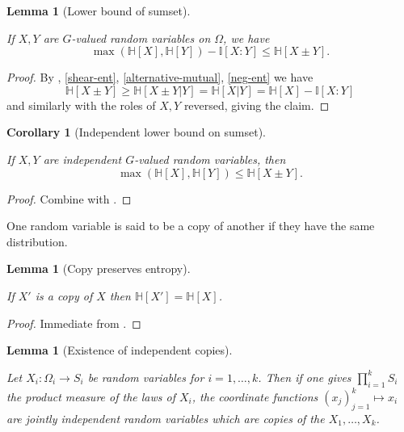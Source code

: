 \documentclass[10pt,a4paper]{article}
\newtheorem{lemma}[theorem]{Lemma}
\newtheorem{corollary}[theorem]{Corollary}
\newcommand{\lean}[1]{}
\newcommand{\uses}[1]{}
\newcommand{\leanok}{}
\newcommand{\bbH}{\mathbb{H}}
\newcommand{\bbI}{\mathbb{I}}
\begin{document}
\begin{lemma}[Lower bound of sumset]\label{sumset-lower-gen}
  \lean{ProbabilityTheory.max_entropy_sub_mutualInfo_le_entropy_add, ProbabilityTheory.max_entropy_sub_mutualInfo_le_entropy_sub}\leanok
  If $X,Y$ are $G$-valued random variables on $\Omega$, we have
$$ \max(\bbH[X], \bbH[Y]) -  \bbI[X:Y] \leq \bbH[X \pm Y].$$
\end{lemma}

\begin{proof}\uses{cond-reduce, alternative-mutual, shear-ent, neg-ent} \leanok
    By , \ref{shear-ent}, \ref{alternative-mutual}, \ref{neg-ent} we have
$$
 \bbH[X\pm Y] \geq \bbH[X\pm Y|Y] = \bbH[X|Y]= \bbH[X] -  \bbI[X:Y]
$$
and similarly with the roles of $X,Y$ reversed, giving the claim.
\end{proof}


\begin{corollary}[Independent lower bound on sumset]
  \label{sumset-lower}
  \lean{ProbabilityTheory.max_entropy_le_entropy_add, ProbabilityTheory.max_entropy_le_entropy_sub}
  \leanok

  If $X,Y$ are independent $G$-valued random variables, then
  $$\max(\bbH[X], \bbH[Y]) \leq \bbH[X\pm Y]. $$
\end{corollary}
\begin{proof}
  \uses{sumset-lower-gen, vanish-entropy}
  \leanok

  Combine  with .
\end{proof}

One random variable is said to be a copy of another if they have the same distribution.

\begin{lemma}[Copy preserves entropy]\label{copy-ent}
  \uses{entropy-def}
  \lean{ProbabilityTheory.IdentDistrib.entropy_congr}\leanok
  If $X'$ is a copy of $X$ then $\bbH[X'] = \bbH[X]$.
\end{lemma}

\begin{proof}\leanok Immediate from .
\end{proof}

\begin{lemma}[Existence of independent copies]\label{independent-exist}
  \uses{independent-def}
  \lean{ProbabilityTheory.independent_copies, ProbabilityTheory.independent_copies', ProbabilityTheory.independent_copies_two, ProbabilityTheory.independent_copies3_nondep} \leanok
  Let $X_i : \Omega_i \to S_i$ be random variables for $i=1,\dots,k$.  Then if one gives $\prod_{i=1}^k S_i$ the product measure of the laws of $X_i$, the coordinate functions $(x_j)_{j=1}^k \mapsto x_i$ are jointly independent random variables which are copies of the $X_1,\dots,X_k$.
\end{lemma}
\end{document}
